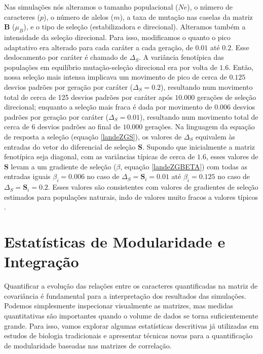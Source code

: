 Nas simulações nós alteramos o tamanho populacional ($Ne$), o número de
caracteres ($p$), o número de alelos ($m$), a taxa de mutação nas caselas da
matriz $\mathbf{B}$ ($\mu_B$), e o tipo de seleção (estabilizadora e direcional).
Alteramos também a intensidade da seleção direcional.
Para isso, modificamos o quanto o pico adaptativo era alterado para cada
caráter a cada geração, de $0.01$ até $0.2$.
Esse deslocamento por caráter é chamado de $\Delta_S$.
A variância fenotípica das populações em equilíbrio mutação-seleção
direcional era por volta de $1.6$.
Então, nossa seleção mais intensa implicava um movimento de pico de
cerca de $0.125$ desvios padrões por geração por caráter ($\Delta_S=0.2$),
resultando num movimento total de cerca de 125 desvios padrões por caráter
após $10.000$ gerações de seleção direcional; enquanto a seleção mais
fraca é dada por movimento de $0.006$ desvios padrões por geração por caráter
($\Delta_S=0.01$), resultando num movimento total de cerca de 6 desvios
padrões ao final de $10.000$ gerações.
Na linguagem da equação de resposta a seleção (equação \ref{landeZGS}),
os valores de $\Delta_S$ equivalem às entradas do vetor do diferencial
de seleção $\mathbf{S}$.
Supondo que inicialmente a matriz fenotípica seja diagonal, com as
variâncias típicas de cerca de $1.6$, esses valores de $\mathbf{S}$
levam a um gradiente de seleção ($\beta$, equação \ref{landeZGBETA}) com
todas as entradas iguais  $\beta_i = 0.006$ no caso de $\Delta_S =
\mathbf{S}_i = 0.01$ até $\beta_i = 0.125$ no caso de $\Delta_S =
\mathbf{S}_i = 0.2$.
Esses valores são consistentes com valores de gradientes de seleção
estimados para populações naturais, indo de valores muito fracos a
valores típicos \citep{Kingsolver2001}.

\section{Estatísticas de Modularidade e Integração}

Quantificar a evolução das relações entre os caracteres quantificadas na
matriz de covariância é fundamental para a interpretação dos resultados
das simulações.
Podemos simplesmente inspecionar visualmente as matrizes, mas medidas
quantitativas são importantes quando o volume de dados se torna
suficientemente grande.
Para isso, vamos explorar algumas estatísticas descritivas já utilizadas em
estudos de biologia tradicionais e apresentar técnicas novas para a
quantificação de modularidade baseadas nas matrizes de correlação.

